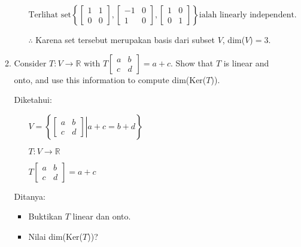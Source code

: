 \documentclass[12pt, a4paper]{scrartcl}
\begin{document}
\begin{enumerate}
\begin{enumerate}
            \begin{itemize}
                \item[] $\mbox{Terlihat set}\left\{\begin{bmatrix}
                    1&1\\0&0
                \end{bmatrix}, \begin{bmatrix}
                    -1&0\\1&0
                \end{bmatrix}, \begin{bmatrix}
                    1&0\\0&1
                \end{bmatrix} \right\} \mbox{ialah linearly independent.}$
            \end{itemize}
            \begin{itemize}
                \item[$\therefore$] Karena set tersebut merupakan basis dari subset $V$, dim($V$)$=3$.
            \end{itemize}

            \pagebreak

            \item Consider $T : V \to \mathbb{R} \mbox{ with } T \begin{bmatrix}
                a & b\\
                c & d
            \end{bmatrix} = a+c$. Show that $T$ is linear and onto, and use this information to compute dim(Ker($T$)).

            Diketahui:
            \begin{itemize}
                \item[] $V = \left\{ \left. \begin{bmatrix}
                    a & b\\
                    c & d
                \end{bmatrix} \right| a+c=b+d \right\}$\item[]$T : V \to \mathbb{R}$ \item[] $T \begin{bmatrix}
                    a & b\\
                    c & d
                \end{bmatrix} = a+c$
            \end{itemize}

            Ditanya:
            \begin{itemize}
                \item Buktikan $T$ linear dan onto.
                \item Nilai dim(Ker($T$))?
            \end{itemize}
            

\end{enumerate}
\end{enumerate}
\end{document}
